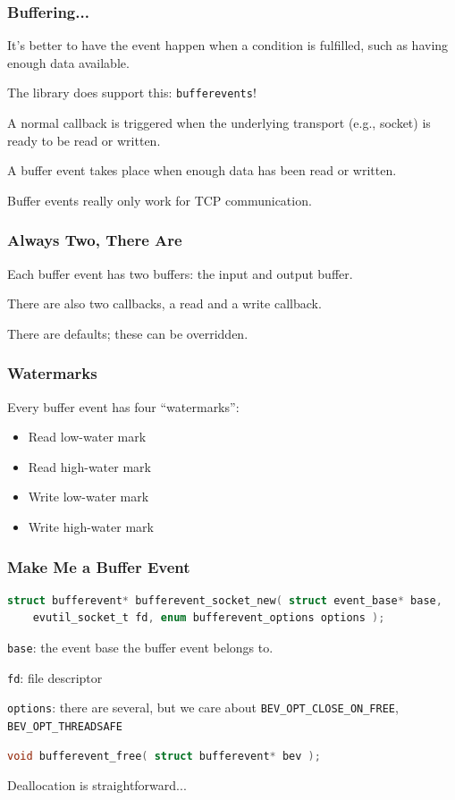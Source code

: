 \begin{frame}
	\frametitle{Buffering...}

	It's better to have the event happen when a condition is fulfilled, such as having enough data available.

	The library does support this: \texttt{bufferevents}!

	A normal callback is triggered when the underlying transport (e.g., socket) is ready to be read or written.

	A buffer event takes place when enough data has been read or written.

	Buffer events really only work for TCP communication.

\end{frame}


\begin{frame}
	\frametitle{Always Two, There Are}

	Each buffer event has two buffers: the input and output buffer.

	There are also two callbacks, a read and a write callback.

	There are defaults; these can be overridden.

\end{frame}


\begin{frame}
	\frametitle{Watermarks}

	Every buffer event has four ``watermarks'':
	\begin{itemize}
		\item Read low-water mark
		\item Read high-water mark
		\item Write low-water mark
		\item Write high-water mark
	\end{itemize}


\end{frame}


\begin{frame}[fragile]
	\frametitle{Make Me a Buffer Event}

	\begin{lstlisting}[language=C]
struct bufferevent* bufferevent_socket_new( struct event_base* base, 
    evutil_socket_t fd, enum bufferevent_options options );
\end{lstlisting}

	\texttt{base}: the event base the buffer event belongs to.

	\texttt{fd}: file descriptor

	\texttt{options}: there are several, but we care about \texttt{BEV\_OPT\_CLOSE\_ON\_FREE}, \texttt{BEV\_OPT\_THREADSAFE}


	\begin{lstlisting}[language=C]
void bufferevent_free( struct bufferevent* bev );
\end{lstlisting}

	Deallocation is straightforward...
\end{frame}

